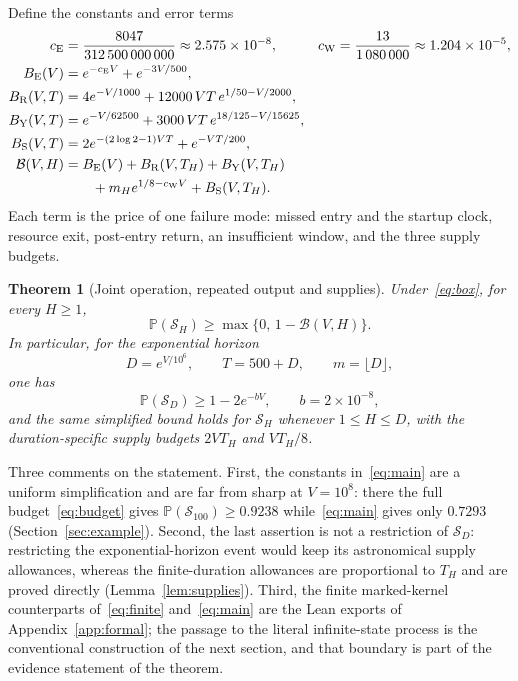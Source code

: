 \documentclass[11pt,a4paper]{article}
\theoremstyle{plain}
\newtheorem{theorem}{Theorem}[section]
\theoremstyle{definition}
\theoremstyle{remark}
\newcommand{\Prob}{\mathbb P}
\newcommand{\cE}{c_{\mathrm E}}
\newcommand{\cW}{c_{\mathrm W}}
\newcommand{\BE}{B_{\mathrm E}}
\newcommand{\BR}{B_{\mathrm R}}
\newcommand{\BY}{B_{\mathrm Y}}
\newcommand{\BS}{B_{\mathrm S}}
\newcommand{\Son}{\mathcal S}
\begin{document}
Define the constants and error terms
\begin{align}
 \cE&=\frac{8047}{312\,500\,000\,000}\approx2.575\times10^{-8},&
 \cW&=\frac{13}{1\,080\,000}\approx1.204\times10^{-5},\label{eq:constants}\\
 \BE(V)&=e^{-\cE V}+e^{-3V/500},\label{eq:entryB}\\
 \BR(V,T)&=4e^{-V/1000}+12000\,VT\,e^{1/50-V/2000},\label{eq:resB}\\
 \BY(V,T)&=e^{-V/62500}+3000\,VT\,e^{18/125-V/15625},\label{eq:retB}\\
 \BS(V,T)&=2e^{-(2\log2-1)VT}+e^{-VT/200},\label{eq:supB}\\
 \mathcal B(V,H)&=\BE(V)+\BR(V,T_H)+\BY(V,T_H)\notag\\
 &\qquad+m_He^{1/8-\cW V}+\BS(V,T_H).\label{eq:budget}
\end{align}
Each term is the price of one failure mode: missed entry and the startup clock, resource exit, post-entry return, an insufficient window, and the three supply budgets.

\begin{theorem}[Joint operation, repeated output and supplies]\label{thm:main}
Under~\eqref{eq:box}, for every $H\ge1$,
\begin{equation}\label{eq:finite}
 \Prob(\Son_H)\ge\max\{0,\,1-\mathcal B(V,H)\}.
\end{equation}
In particular, for the exponential horizon
\begin{equation}\label{eq:exphorizon}
 D=e^{V/10^6},\qquad T=500+D,\qquad m=\lfloor D\rfloor,
\end{equation}
one has
\begin{equation}\label{eq:main}
 \Prob(\Son_D)\ge1-2e^{-bV},\qquad b=2\times10^{-8},
\end{equation}
and the same simplified bound holds for $\Son_H$ whenever $1\le H\le D$, with the duration-specific supply budgets $2VT_H$ and $VT_H/8$.
\end{theorem}

Three comments on the statement. First, the constants in~\eqref{eq:main} are a uniform simplification and are far from sharp at $V=10^8$: there the full budget~\eqref{eq:budget} gives $\Prob(\Son_{100})\ge0.9238$ while~\eqref{eq:main} gives only $0.7293$ (Section~\ref{sec:example}). Second, the last assertion is not a restriction of $\Son_D$: restricting the exponential-horizon event would keep its astronomical supply allowances, whereas the finite-duration allowances are proportional to $T_H$ and are proved directly (Lemma~\ref{lem:supplies}). Third, the finite marked-kernel counterparts of~\eqref{eq:finite} and~\eqref{eq:main} are the Lean exports of Appendix~\ref{app:formal}; the passage to the literal infinite-state process is the conventional construction of the next section, and that boundary is part of the evidence statement of the theorem.
\end{document}
